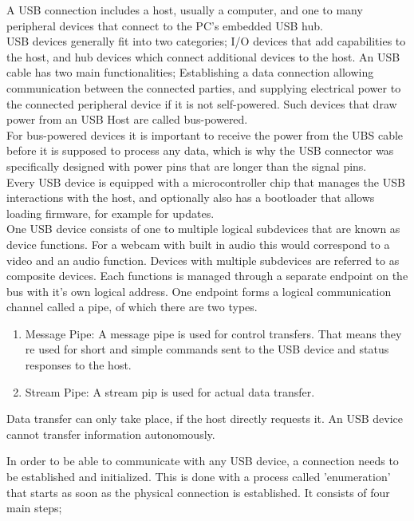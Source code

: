 A USB connection includes a host, usually a computer, and one to many peripheral devices that connect to the PC's embedded USB hub.  \\
USB devices generally fit into two categories; I/O devices that add capabilities to the host, and hub devices which connect additional devices to the host. An USB cable has two main functionalities; Establishing a data connection allowing communication between the connected parties, and supplying electrical power to the connected peripheral device if it is not self-powered. Such devices that draw power from an USB Host are called bus-powered. \\ 
For bus-powered devices it is important to receive the power from the UBS cable before it is supposed to process any data, which is why the USB connector was specifically designed with power pins that are longer than the signal pins.\\
Every USB device is equipped with a microcontroller chip that manages the USB interactions with the host, and optionally also has a bootloader that allows loading firmware, for example for updates. \\
One USB device consists of one to multiple logical subdevices that are known as device functions. For a webcam with built in audio this would correspond to a video and an audio function. Devices with multiple subdevices are referred to as composite devices. Each functions is managed through a separate endpoint on the bus with it's own logical address. One endpoint forms a logical communication channel called a pipe, of which there are two types.  
\begin{enumerate}
    \item Message Pipe: A message pipe is used for control transfers. That means they re used for short and simple commands sent to the USB device and status responses to the host.
    \item Stream Pipe: A stream pip is used for actual data transfer.
\end{enumerate}
Data transfer can only take place, if the host directly requests it. An USB device cannot transfer information autonomously. 

In order to be able to communicate with any USB device, a connection needs to be established and initialized. This is done with a process called 'enumeration' that starts as soon as the physical connection is established. It consists of four main steps;

